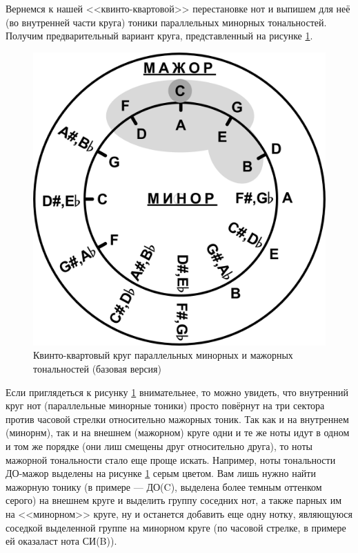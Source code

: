 Вернемся к нашей <<квинто-квартовой>> перестановке нот и выпишем для неё (во внутренней части круга) тоники параллельных минорных тональностей. Получим предварительный вариант круга, представленный на рисунке \ref{fig:harmony:kvinto-kvarto:kvinto-kvarto-parallel}.

\begin{figure}[!ht]
    \centering
    \includegraphics[scale=0.5]{fig/kvinto-kvarto/kvinto-kvarto-parallel} 
    \caption{Квинто-квартовый круг параллельных минорных и мажорных тональностей (базовая версия)}\label{fig:harmony:kvinto-kvarto:kvinto-kvarto-parallel}
\end{figure}

Если приглядеться к рисунку \ref{fig:harmony:kvinto-kvarto:kvinto-kvarto-parallel} внимательнее, то можно увидеть, что внутренний круг нот (параллельные минорные тоники) просто повёрнут на три сектора против часовой стрелки относительно мажорных тоник. Так как и на внутреннем (минорнм), так и на внешнем (мажорном) круге одни и те же ноты идут в одном и том же порядке (они лиш смещены друг относительно друга), то ноты мажорной тональности стало еще проще искать. Например, ноты тональности ДО-мажор выделены на рисунке \ref{fig:harmony:kvinto-kvarto:kvinto-kvarto-parallel} серым цветом. Вам лишь нужно найти мажорную тонику (в примере --- ДО(C), выделена более темным оттенком серого) на внешнем круге и выделить группу соседних нот, а также парных им на <<минорном>> круге, ну и останется добавить еще одну нотку, являющуюся соседкой выделенной группе на минорном круге (по часовой стрелке, в примере ей оказаласт нота СИ(B)).

